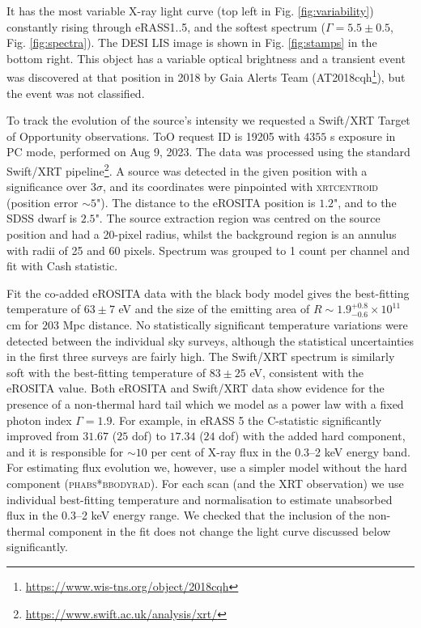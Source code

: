 \documentclass[fleqn,usenatbib]{mnras}
\begin{document}
It has the most variable X-ray light curve (top left in Fig. \ref{fig:variability}) constantly rising through eRASS1..5, and the softest spectrum ($\Gamma=5.5\pm0.5$, Fig. \ref{fig:spectra}). The DESI LIS image is shown in Fig. \ref{fig:stamps} in the bottom right.  This object has a variable optical brightness and a transient event was discovered at that position in 2018 by Gaia Alerts Team (AT2018cqh\footnote{\url{https://www.wis-tns.org/object/2018cqh}}), but the event was not classified.


To track the evolution of the source's intensity we requested a Swift/XRT \citep{Burrows2005} Target of Opportunity observations. ToO request ID is 19205 with $4355$ s exposure in PC mode, performed on Aug 9, 2023. The data was processed using the standard Swift/XRT pipeline\footnote{\url{https://www.swift.ac.uk/analysis/xrt/}}. A source was detected in the given position with a significance over $3\sigma$, and its coordinates were pinpointed with \textsc{xrtcentroid} (position error $\sim5$"). The distance to the eROSITA position  is $1.2$", and to the SDSS dwarf is $2.5$". The source extraction region was centred on the source position and had a 20-pixel radius, whilst the background region is an annulus with radii of 25 and 60 pixels. Spectrum was grouped to 1 count per channel and fit with Cash statistic.


 Fit the co-added eROSITA data with the black body model gives the best-fitting temperature of $63\pm7  $ eV and the size of the emitting area of $R\sim1.9^{+0.8}_{-0.6}\times10^{11}$ cm for $203$ Mpc distance. No statistically significant temperature variations were detected between the individual sky surveys, although the statistical uncertainties in the first three surveys are fairly high. The Swift/XRT spectrum is similarly soft with the best-fitting temperature of $83\pm25$ eV, consistent with the  eROSITA value.  Both eROSITA and Swift/XRT data show evidence for the presence of a  non-thermal hard tail which we model as a power law with a fixed photon index $\Gamma=1.9$. For example, in eRASS 5 the C-statistic significantly improved from $31.67$ ($25$ dof) to $17.34$ ($24$ dof) with the added hard component, and it is responsible for $\sim10$ per cent of X-ray flux in the 0.3--2 keV energy band.  For estimating flux evolution we, however, use a simpler model without the hard component (\textsc{phabs*bbodyrad}). For each scan (and the XRT observation) we use individual best-fitting temperature and normalisation to estimate unabsorbed flux in the 0.3--2 keV energy range. 
We checked that the inclusion of the non-thermal component in the fit does not change the light curve discussed below significantly.
\end{document}
